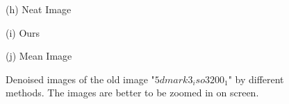 \documentclass[10pt,twocolumn,letterpaper]{article}
\begin{document}
\begin{figure}
{\begin{minipage}[t]{0.2\textwidth}
{\footnotesize (h) Neat Image}
\end{minipage}
\begin{minipage}[t]{0.2\textwidth}
\centering
{}
{\footnotesize (i) Ours }
\end{minipage}
\begin{minipage}[t]{0.2\textwidth}
\centering
{}
{\footnotesize (j) Mean Image }
\end{minipage}
}
\caption{Denoised images of the old image "$5dmark3_iso3200_1$" by different methods. The images are better to be zoomed in on screen.}
\label{fig2}
\end{figure}
\end{document}
